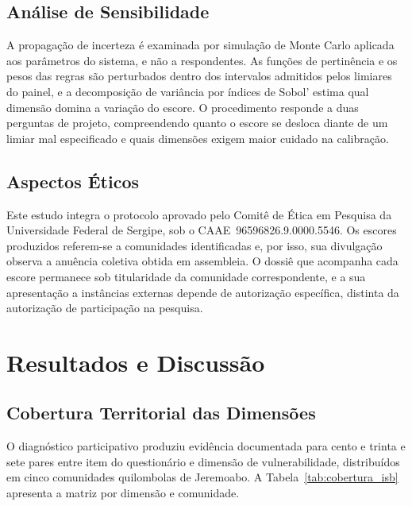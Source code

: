 \documentclass[pdflatex,sn-basic]{sn-jnl}%
\theoremstyle{thmstyleone}%
\theoremstyle{thmstyletwo}%
\theoremstyle{thmstylethree}%
\begin{document}
\subsection{Análise de Sensibilidade}

A propagação de incerteza é examinada por simulação de Monte Carlo aplicada aos parâmetros do sistema, e não a respondentes. As funções de pertinência e os pesos das regras são perturbados dentro dos intervalos admitidos pelos limiares do painel, e a decomposição de variância por índices de Sobol' estima qual dimensão domina a variação do escore. O procedimento responde a duas perguntas de projeto, compreendendo quanto o escore se desloca diante de um limiar mal especificado e quais dimensões exigem maior cuidado na calibração.

\subsection{Aspectos Éticos}

Este estudo integra o protocolo aprovado pelo Comitê de Ética em Pesquisa da Universidade Federal de Sergipe, sob o CAAE~96596826.9.0000.5546. Os escores produzidos referem-se a comunidades identificadas e, por isso, sua divulgação observa a anuência coletiva obtida em assembleia. O dossiê que acompanha cada escore permanece sob titularidade da comunidade correspondente, e a sua apresentação a instâncias externas depende de autorização específica, distinta da autorização de participação na pesquisa.

\section{Resultados e Discussão}

\subsection{Cobertura Territorial das Dimensões}

O diagnóstico participativo produziu evidência documentada para cento e trinta e sete pares entre item do questionário e dimensão de vulnerabilidade, distribuídos em cinco comunidades quilombolas de Jeremoabo. A Tabela~\ref{tab:cobertura_isb} apresenta a matriz por dimensão e comunidade.
\end{document}
